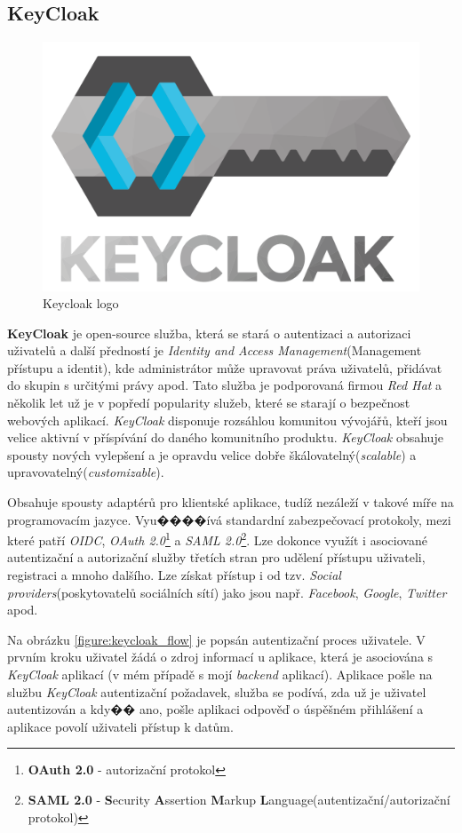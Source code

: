 \subsection*{KeyCloak}
\label{terminy:keycloak}

\begin{figure}[hbt]
  \centering
  \includegraphics[width=.25 \linewidth]{obrazky-figures/keycloak2.png}
  \caption{Keycloak logo}
\end{figure}

\textbf{KeyCloak} je open-source služba, která se stará o autentizaci a autorizaci uživatelů a další předností je \emph{Identity and Access Management}(Management přístupu a identit), kde administrátor může upravovat práva uživatelů, přidávat do skupin s určitými právy apod.
Tato služba je podporovaná firmou \emph{Red Hat} a několik let už je v popředí popularity služeb, které se starají o bezpečnost webových aplikací. \emph{KeyCloak} disponuje rozsáhlou komunitou vývojářů, kteří jsou velice aktivní v příspívání do daného komunitního produktu.
\emph{KeyCloak} obsahuje spousty nových vylepšení a je opravdu velice dobře škálovatelný(\emph{scalable}) a upravovatelný(\emph{customizable}).

Obsahuje spousty adaptérů pro klientské aplikace, tudíž nezáleží v takové míře na programovacím jazyce.
Vyu����ívá standardní zabezpečovací protokoly, mezi které patří \emph{OIDC}, \emph{OAuth 2.0}\footnote{\textbf{OAuth 2.0} - autorizační protokol} a \emph{SAML 2.0}\footnote{\textbf{SAML 2.0} - \textbf{S}ecurity \textbf{A}ssertion \textbf{M}arkup \textbf{L}anguage(autentizační/autorizační protokol)}.
Lze dokonce využít i asociované autentizační a autorizační služby třetích stran pro udělení přístupu uživateli, registraci a mnoho dalšího. Lze získat přístup i od tzv. \emph{Social providers}(poskytovatelů sociálních sítí) jako jsou např. \emph{Facebook}, \emph{Google}, \emph{Twitter} apod.

Na obrázku \ref{figure:keycloak_flow} je popsán autentizační proces uživatele. V prvním kroku uživatel žádá o zdroj informací u aplikace, která je asociována s \emph{KeyCloak} aplikací (v mém případě s mojí \emph{backend} aplikací).
Aplikace pošle na službu \emph{KeyCloak} autentizační požadavek, služba se podívá, zda už je uživatel autentizován a kdy�� ano, pošle aplikaci odpověď o úspěšném přihlášení a aplikace povolí uživateli přístup k datům.


